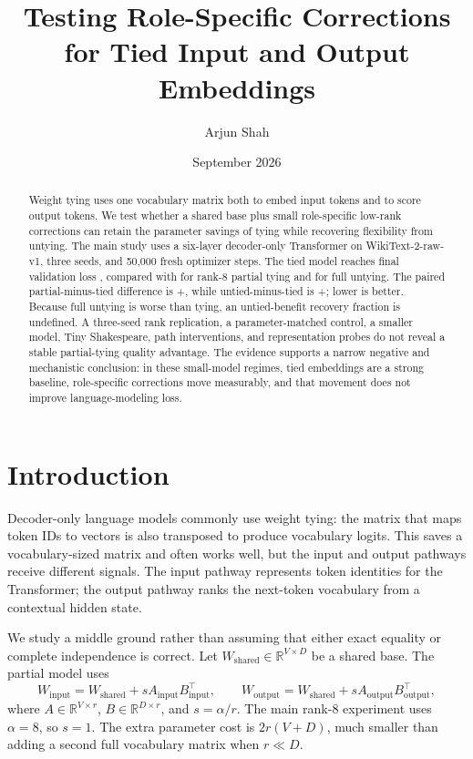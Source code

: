 \documentclass[11pt]{article}
\title{Testing Role-Specific Corrections for Tied Input and Output Embeddings}
\author{Arjun Shah}
\date{September 2026}
\begin{document}

\maketitle

\begin{abstract}
Weight tying uses one vocabulary matrix both to embed input tokens and to score output tokens. We test whether a shared base plus small role-specific low-rank corrections can retain the parameter savings of tying while recovering flexibility from untying. The main study uses a six-layer decoder-only Transformer on WikiText-2-raw-v1, three seeds, and 50,000 fresh optimizer steps. The tied model reaches final validation loss \TiedFinalLoss{}, compared with \PartialFinalLoss{} for rank-8 partial tying and \UntiedFinalLoss{} for full untying. The paired partial-minus-tied difference is +\PartialVsTiedDelta{}, while untied-minus-tied is +\UntiedVsTiedDelta{}; lower is better. Because full untying is worse than tying, an untied-benefit recovery fraction is undefined. A three-seed rank replication, a parameter-matched control, a smaller model, Tiny Shakespeare, path interventions, and representation probes do not reveal a stable partial-tying quality advantage. The evidence supports a narrow negative and mechanistic conclusion: in these small-model regimes, tied embeddings are a strong baseline, role-specific corrections move measurably, and that movement does not improve language-modeling loss.
\end{abstract}

\section{Introduction}

Decoder-only language models commonly use weight tying: the matrix that maps token IDs to vectors is also transposed to produce vocabulary logits. This saves a vocabulary-sized matrix and often works well, but the input and output pathways receive different signals. The input pathway represents token identities for the Transformer; the output pathway ranks the next-token vocabulary from a contextual hidden state.

We study a middle ground rather than assuming that either exact equality or complete independence is correct. Let $W_{\mathrm{shared}}\in\mathbb{R}^{V\times D}$ be a shared base. The partial model uses
\begin{equation}
 W_{\mathrm{input}} = W_{\mathrm{shared}} + s A_{\mathrm{input}}B_{\mathrm{input}}^\top,
 \qquad
 W_{\mathrm{output}} = W_{\mathrm{shared}} + s A_{\mathrm{output}}B_{\mathrm{output}}^\top,
\end{equation}
where $A\in\mathbb{R}^{V\times r}$, $B\in\mathbb{R}^{D\times r}$, and $s=\alpha/r$. The main rank-8 experiment uses $\alpha=8$, so $s=1$. The extra parameter cost is $2r(V+D)$, much smaller than adding a second full vocabulary matrix when $r\ll D$.
\end{document}
